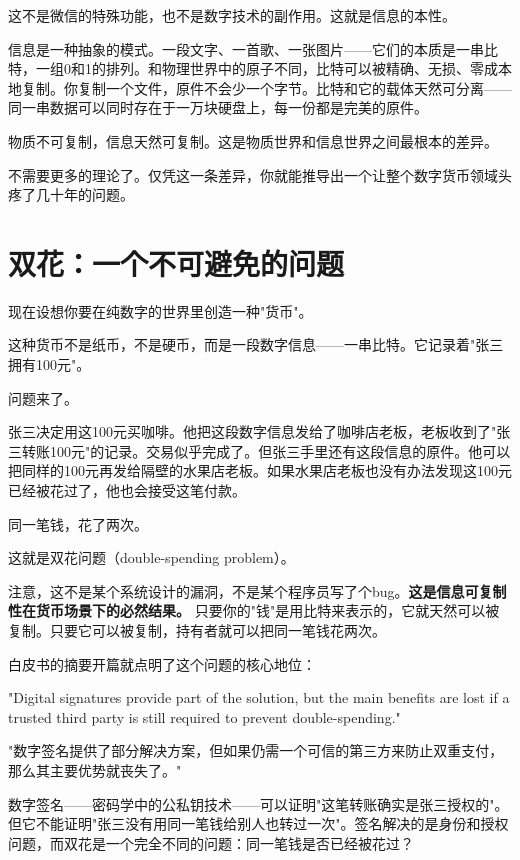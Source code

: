 \documentclass[a4paper,12pt,openany]{ctexbook}
\newenvironment{quoting}{%
  \par\vspace{0.5em}%
  \begin{list}{}{%
    \setlength{\leftmargin}{2em}%
    \setlength{\rightmargin}{2em}%
    \setlength{\parsep}{0.3em}%
    \setlength{\itemsep}{0pt}%
    \setlength{\topsep}{0pt}%
  }%
  \item\relax
}{%
  \end{list}%
  \par\vspace{0.5em}%
}
\begin{document}
这不是微信的特殊功能，也不是数字技术的副作用。这就是信息的本性。

信息是一种抽象的模式。一段文字、一首歌、一张图片——它们的本质是一串比特，一组0和1的排列。和物理世界中的原子不同，比特可以被精确、无损、零成本地复制。你复制一个文件，原件不会少一个字节。比特和它的载体天然可分离——同一串数据可以同时存在于一万块硬盘上，每一份都是完美的原件。

物质不可复制，信息天然可复制。这是物质世界和信息世界之间最根本的差异。

不需要更多的理论了。仅凭这一条差异，你就能推导出一个让整个数字货币领域头疼了几十年的问题。


\section*{双花：一个不可避免的问题}


现在设想你要在纯数字的世界里创造一种"货币"。

这种货币不是纸币，不是硬币，而是一段数字信息——一串比特。它记录着"张三拥有100元"。

问题来了。

张三决定用这100元买咖啡。他把这段数字信息发给了咖啡店老板，老板收到了"张三转账100元"的记录。交易似乎完成了。但张三手里还有这段信息的原件。他可以把同样的100元再发给隔壁的水果店老板。如果水果店老板也没有办法发现这100元已经被花过了，他也会接受这笔付款。

同一笔钱，花了两次。

这就是双花问题（double-spending problem）。

注意，这不是某个系统设计的漏洞，不是某个程序员写了个bug。\textbf{这是信息可复制性在货币场景下的必然结果。} 只要你的"钱"是用比特来表示的，它就天然可以被复制。只要它可以被复制，持有者就可以把同一笔钱花两次。

白皮书的摘要开篇就点明了这个问题的核心地位：


\begin{quoting}
\small
"Digital signatures provide part of the solution, but the main benefits are lost if a trusted third party is still required to prevent double-spending."

"数字签名提供了部分解决方案，但如果仍需一个可信的第三方来防止双重支付，那么其主要优势就丧失了。"
\end{quoting}


数字签名——密码学中的公私钥技术——可以证明"这笔转账确实是张三授权的"。但它不能证明"张三没有用同一笔钱给别人也转过一次"。签名解决的是身份和授权问题，而双花是一个完全不同的问题：同一笔钱是否已经被花过？
\end{document}
